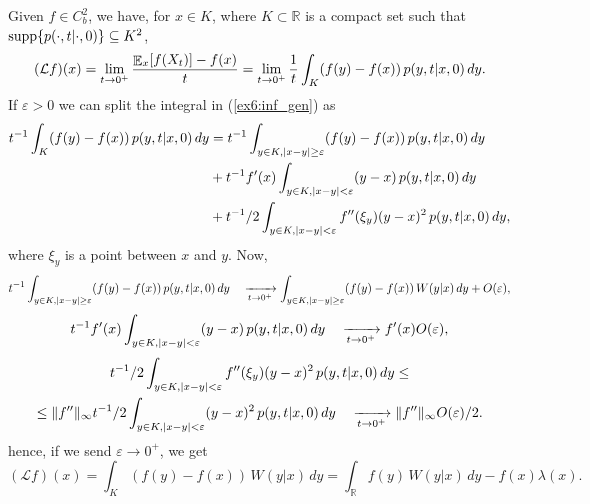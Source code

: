 \documentclass[a4paper,11pt]{article}
\theoremstyle{definition}
\theoremstyle{plain}
\theoremstyle{remark}
\DeclarePairedDelimiter{\abs}{\lvert}{\rvert}
\DeclarePairedDelimiter{\norm}{\lVert}{\rVert}
\DeclarePairedDelimiter{\parq}{[}{]}
\DeclarePairedDelimiter{\bra}{\lbrace}{\rbrace}
\DeclareMathOperator*{\expval}{\mathbb{E}}
\begin{document}
Given $f\in C^2_b$, we have, for $x\in K$, where $K\subset\mathbb{R}$ is a compact set such that $\mathrm{supp}\bra{p(\cdot,t|\cdot,0)}\subseteq K^2$, 
\begin{equation}\label{ex6:inf_gen}
(\mathcal{L}f)(x) = \lim_{t\to 0^+}\frac{\expval_x\parq{f(X_t)} - f(x)}{t} = \lim_{t\to 0^+}\frac{1}{t}\int_K (f(y)-f(x))\,p(y,t|x,0)\,dy. 
\end{equation}
If $\varepsilon>0$ we can split the integral in (\ref{ex6:inf_gen}) as
\begin{align*}
t^{-1}\int_K (f(y)-f(x))\,p(y,t|x,0)\,dy & = t^{-1}\int_{y\in K, \abs{x-y}\geq\varepsilon} (f(y)-f(x))\,p(y,t|x,0)\,dy \\ & + t^{-1}f'(x)\int_{y\in K, \abs{x-y}<\varepsilon} (y-x)\,p(y,t|x,0)\,dy \\ & + t^{-1}/2\int_{y\in K, \abs{x-y}<\varepsilon} f''(\xi_y)(y-x)^2\,p(y,t|x,0)\,dy,
\end{align*}
where $\xi_y$ is a point between $x$ and $y$. Now,
$$
t^{-1}\int_{y\in K, \abs{x-y}\geq\varepsilon} (f(y)-f(x))\,p(y,t|x,0)\,dy \quad  \xrightarrow[t\to0^+] \quad \int_{y\in K, \abs{x-y}\geq\varepsilon} (f(y)-f(x))\,W(y|x)\,dy + O(\varepsilon),
$$
$$
t^{-1}f'(x)\int_{y\in K, \abs{x-y}<\varepsilon} (y-x)\,p(y,t|x,0)\,dy \quad  \xrightarrow[t\to0^+] \quad f'(x)O(\varepsilon), 
$$
\begin{multline*}
t^{-1}/2\int_{y\in K, \abs{x-y}<\varepsilon} f''(\xi_y)(y-x)^2\,p(y,t|x,0)\,dy \leq \\ \leq \norm{f''}_\infty t^{-1}/2\int_{y\in K, \abs{x-y}<\varepsilon} (y-x)^2\,p(y,t|x,0)\,dy \quad  \xrightarrow[t\to0^+] \quad \norm{f''}_\infty O(\varepsilon)/2.
\end{multline*}
hence, if we send $\varepsilon\to 0^+$, we get
$$
(\mathcal{L}f)(x) = \int_{K} (f(y)-f(x))\,W(y|x)\,dy = \int_\mathbb{R} f(y)\,W(y|x)\,dy - f(x)\lambda(x).
$$
\end{document}
